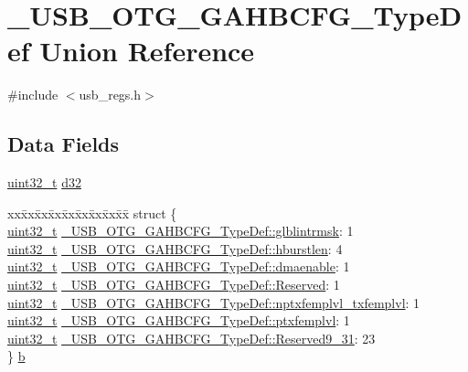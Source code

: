 \hypertarget{union___u_s_b___o_t_g___g_a_h_b_c_f_g___type_def}{\section{\-\_\-\-U\-S\-B\-\_\-\-O\-T\-G\-\_\-\-G\-A\-H\-B\-C\-F\-G\-\_\-\-Type\-Def Union Reference}
\label{union___u_s_b___o_t_g___g_a_h_b_c_f_g___type_def}
}


{\ttfamily \#include $<$usb\-\_\-regs.\-h$>$}

\subsection*{Data Fields}
\begin{DoxyCompactItemize}
\item 
\hyperlink{stdint_8h_a435d1572bf3f880d55459d9805097f62}{uint32\-\_\-t} \hyperlink{group___u_s_b___o_t_g___d_r_i_v_e_r_ga30dd79fdb9e4a7f5cb48555928b8fbe3}{d32}
\item 
\begin{tabbing}
xx\=xx\=xx\=xx\=xx\=xx\=xx\=xx\=xx\=\kill
struct \{\\
\>\hyperlink{stdint_8h_a435d1572bf3f880d55459d9805097f62}{uint32\_t} \hyperlink{group___u_s_b___o_t_g___d_r_i_v_e_r_ga6d5b18dc5c45a9377ff26ae705e237f0}{\_USB\_OTG\_GAHBCFG\_TypeDef::glblintrmsk}: 1\\
\>\hyperlink{stdint_8h_a435d1572bf3f880d55459d9805097f62}{uint32\_t} \hyperlink{group___u_s_b___o_t_g___d_r_i_v_e_r_gaef76ba04426956f90a8f6f25dd493051}{\_USB\_OTG\_GAHBCFG\_TypeDef::hburstlen}: 4\\
\>\hyperlink{stdint_8h_a435d1572bf3f880d55459d9805097f62}{uint32\_t} \hyperlink{group___u_s_b___o_t_g___d_r_i_v_e_r_gaa752eec03f809fffd6f0f46f34b5752d}{\_USB\_OTG\_GAHBCFG\_TypeDef::dmaenable}: 1\\
\>\hyperlink{stdint_8h_a435d1572bf3f880d55459d9805097f62}{uint32\_t} \hyperlink{group___u_s_b___o_t_g___d_r_i_v_e_r_ga44156423025612e25b7e6c0f473b5a50}{\_USB\_OTG\_GAHBCFG\_TypeDef::Reserved}: 1\\
\>\hyperlink{stdint_8h_a435d1572bf3f880d55459d9805097f62}{uint32\_t} \hyperlink{group___u_s_b___o_t_g___d_r_i_v_e_r_gae2801f85844ee69bae3fcb3a2e9d201e}{\_USB\_OTG\_GAHBCFG\_TypeDef::nptxfemplvl\_txfemplvl}: 1\\
\>\hyperlink{stdint_8h_a435d1572bf3f880d55459d9805097f62}{uint32\_t} \hyperlink{group___u_s_b___o_t_g___d_r_i_v_e_r_ga8aef75b0d6a052f8e4e305e99f9dca16}{\_USB\_OTG\_GAHBCFG\_TypeDef::ptxfemplvl}: 1\\
\>\hyperlink{stdint_8h_a435d1572bf3f880d55459d9805097f62}{uint32\_t} \hyperlink{group___u_s_b___o_t_g___d_r_i_v_e_r_ga5a325042322da6633f76b2a0c489940b}{\_USB\_OTG\_GAHBCFG\_TypeDef::Reserved9\_31}: 23\\
\} \hyperlink{group___u_s_b___o_t_g___d_r_i_v_e_r_ga8ae85bd362af6e19047437743ff22b55}{b}\\

\end{tabbing}\end{DoxyCompactItemize}


